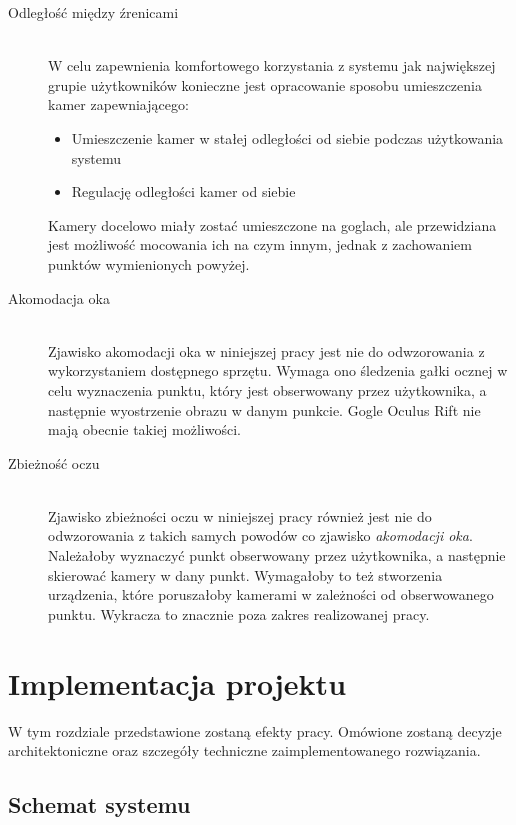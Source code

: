 \documentclass[a4paper,11pt,twoside]{report}
\theoremstyle{definition}
\begin{document}
\begin{description}

\item[Odległość między źrenicami] \hfill \\
W celu zapewnienia komfortowego korzystania z systemu jak największej grupie użytkowników konieczne jest opracowanie sposobu umieszczenia kamer zapewniającego:
\begin{itemize}
\item Umieszczenie kamer w stałej odległości od siebie podczas użytkowania systemu
\item Regulację odległości kamer od siebie
\end{itemize}

Kamery docelowo miały zostać umieszczone na goglach, ale przewidziana jest możliwość mocowania ich na czym innym, jednak z zachowaniem punktów wymienionych powyżej.

\item [Akomodacja oka] \hfill \\
Zjawisko akomodacji oka w niniejszej pracy jest nie do odwzorowania z wykorzystaniem dostępnego sprzętu. Wymaga ono śledzenia gałki ocznej w celu wyznaczenia punktu, który jest obserwowany przez użytkownika, a następnie wyostrzenie obrazu w danym punkcie. Gogle Oculus Rift nie mają obecnie takiej możliwości.

\item[Zbieżność oczu] \hfill \\
Zjawisko zbieżności oczu w niniejszej pracy również jest nie do odwzorowania z takich samych powodów co zjawisko \textit{akomodacji oka}. Należałoby wyznaczyć punkt obserwowany przez użytkownika, a następnie skierować kamery w dany punkt. Wymagałoby to też stworzenia urządzenia, które poruszałoby kamerami w zależności od obserwowanego punktu. Wykracza to znacznie poza zakres realizowanej pracy.

\end{description}

\chapter{Implementacja projektu}
W tym rozdziale przedstawione zostaną efekty pracy. Omówione zostaną decyzje architektoniczne oraz szczegóły techniczne zaimplementowanego rozwiązania.

\section{Schemat systemu}
\end{document}
